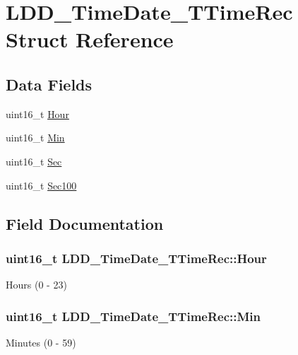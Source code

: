 \hypertarget{struct_l_d_d___time_date___t_time_rec}{}\section{L\+D\+D\+\_\+\+Time\+Date\+\_\+\+T\+Time\+Rec Struct Reference}
\label{struct_l_d_d___time_date___t_time_rec}
\subsection*{Data Fields}
\begin{DoxyCompactItemize}
\item 
uint16\+\_\+t \hyperlink{struct_l_d_d___time_date___t_time_rec_ac741c5c14148b2d360bb09fedc6ebabd}{Hour}
\item 
uint16\+\_\+t \hyperlink{struct_l_d_d___time_date___t_time_rec_a7cea2c409e90bccdc33f19b093020373}{Min}
\item 
uint16\+\_\+t \hyperlink{struct_l_d_d___time_date___t_time_rec_a05cccc86e89e5704b0460caaf2429f75}{Sec}
\item 
uint16\+\_\+t \hyperlink{struct_l_d_d___time_date___t_time_rec_a2cd2e13e7c478f04ea1c4c460b104491}{Sec100}
\end{DoxyCompactItemize}


\subsection{Field Documentation}
\subsubsection[{\texorpdfstring{Hour}{Hour}}]{\setlength{\rightskip}{0pt plus 5cm}uint16\+\_\+t L\+D\+D\+\_\+\+Time\+Date\+\_\+\+T\+Time\+Rec\+::\+Hour}\hypertarget{struct_l_d_d___time_date___t_time_rec_ac741c5c14148b2d360bb09fedc6ebabd}{}\label{struct_l_d_d___time_date___t_time_rec_ac741c5c14148b2d360bb09fedc6ebabd}
Hours (0 -\/ 23) 
\subsubsection[{\texorpdfstring{Min}{Min}}]{\setlength{\rightskip}{0pt plus 5cm}uint16\+\_\+t L\+D\+D\+\_\+\+Time\+Date\+\_\+\+T\+Time\+Rec\+::\+Min}\hypertarget{struct_l_d_d___time_date___t_time_rec_a7cea2c409e90bccdc33f19b093020373}{}\label{struct_l_d_d___time_date___t_time_rec_a7cea2c409e90bccdc33f19b093020373}
Minutes (0 -\/ 59) 
